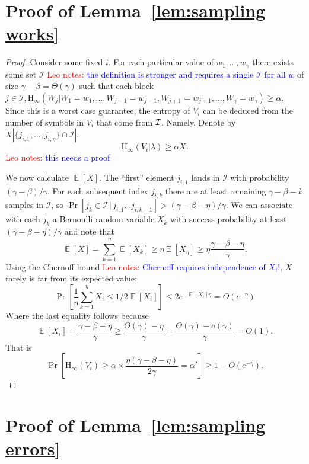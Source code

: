 \documentclass[11pt]{article}
\newcommand{\lemref}[1]{\mbox{Lemma~\ref{#1}}}
\DeclareMathOperator*{\expe}{\mathbb{E}}
\newcommand{\Hoo}{\mathrm{H}_\infty}
\newcommand{\authnote}[2]{{\textcolor{red}{\textsf{#1 notes: }\textcolor{blue}{ #2}}\marginpar{\textcolor{red}{\textbf{!!!!!}}}}}
\newcommand{\authnote}[2]{}
\newcommand{\lnote}[1]{{\authnote{Leo}{#1}}}
\begin{document}
\section{Proof of \lemref{lem:sampling works}}
\label{sec:proof of sampling lemma}
\begin{proof}
Consider some fixed $i$.
For each particular value of $w_1,..., w_\gamma$ there exists some set $\mathcal{I}$ \lnote{the definition is stronger and requires a single $\mathcal{I}$ for all $w$} of size $\gamma - \beta = \Theta(\gamma)$ such that each block $j\in \mathcal{I}, \Hoo(W_j | W_1 = w_1,..., W_{j-1}=w_{j-1}, W_{j+1}=w_{j+1},..., W_\gamma = w_\gamma) \geq \alpha$.  Since this is a worst case guarantee, the entropy of $V_i$ can be deduced from the number of symbols in $V_i$ that come from $\cal{I}$. Namely, Denote by $X |\{j_{i, 1},..., j_{i, \eta}\}\cap \mathcal{I}|$.
\[
\Hoo(V_i |\lambda ) \geq \alpha X.
\]
\lnote{this needs a proof}

We now calculate $\expe[X]$. The ``first'' element $j_{i,1}$ lands in $\mathcal{I}$ with probability $(\gamma-\beta)/\gamma$.  For each subsequent index $j_{i,k}$ there are at least remaining $\gamma-\beta-k$ samples in $\mathcal{I}$, so $\Pr[j_k\in\mathcal{I}\,|\,j_{i,1}\dots j_{i,k-1}]>(\gamma-\beta-\eta)/\gamma$.  We can associate with each $j_k$ a Bernoulli random variable $X_k$ with success probability at least $(\gamma-\beta-\eta)/\gamma$ and note that 
\[
\expe[X] = \sum_{k=1}^\eta\expe[X_k] \geq \eta \expe[X_\eta]\geq \eta\frac{\gamma-\beta-\eta}{\gamma}.
\]
Using the Chernoff bound \lnote{Chernoff requires independence of $X_i$!}, $X$ rarely is far from its expected value:
\[
\Pr\left[ \frac{1}{\eta} \sum_{k=1}^\eta X_i \leq 1/2 \expe[X_i]\right]\leq 2e^{-\expe[X_i] \eta} = O(e^{-\eta})
\]
Where the last equality follows because 
\[
\expe[ X_i] = \frac{\gamma-\beta-\eta}{\gamma} \geq \frac{\Theta(\gamma) - \eta}{\gamma} = \frac{\Theta(\gamma) - o(\gamma)}{\gamma} = O(1).
\]
That is \[
\Pr[\Hoo(V_i ) \geq \alpha \times \frac{\eta(\gamma-\beta-\eta)}{2\gamma} = \alpha'] \geq 1- O(e^{-\eta}).
\]
\end{proof}

\section{Proof of \lemref{lem:sampling errors}}
\label{sec:sampling errors}
\end{document}
